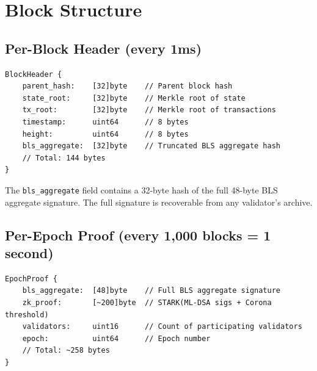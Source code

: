 \section{Block Structure}


\subsection{Per-Block Header (every 1ms)}

\begin{verbatim}
BlockHeader {
    parent_hash:    [32]byte    // Parent block hash
    state_root:     [32]byte    // Merkle root of state
    tx_root:        [32]byte    // Merkle root of transactions
    timestamp:      uint64      // 8 bytes
    height:         uint64      // 8 bytes
    bls_aggregate:  [32]byte    // Truncated BLS aggregate hash
    // Total: 144 bytes
}
\end{verbatim}

The \texttt{bls\_aggregate} field contains a 32-byte hash of the full 48-byte BLS aggregate signature. The full signature is recoverable from any validator's archive.

\subsection{Per-Epoch Proof (every 1,000 blocks = 1 second)}

\begin{verbatim}
EpochProof {
    bls_aggregate:  [48]byte    // Full BLS aggregate signature
    zk_proof:       [~200]byte  // STARK(ML-DSA sigs + Corona threshold)
    validators:     uint16      // Count of participating validators
    epoch:          uint64      // Epoch number
    // Total: ~258 bytes
}
\end{verbatim}

